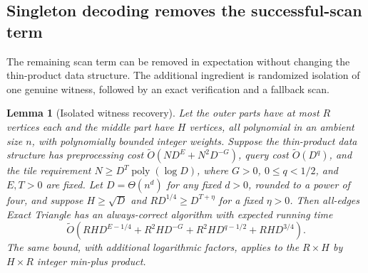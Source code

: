 \documentclass[11pt]{article}
\newtheorem{lemma}[theorem]{Lemma}
\newcommand{\softO}{\widetilde O}
\begin{document}
\subsection*{Singleton decoding removes the successful-scan term}
The remaining scan term can be removed in expectation without changing the
thin-product data structure. The additional ingredient is randomized
isolation of one genuine witness, followed by an exact verification and a
fallback scan.

\begin{lemma}[Isolated witness recovery]
\label{lem:isolation}
Let the outer parts have at most $R$ vertices each and the middle part have
$H$ vertices, all polynomial in an ambient size $n$, with polynomially
bounded integer weights. Suppose the thin-product data structure has
preprocessing cost $\softO(ND^E+N^2D^{-G})$, query cost $\softO(D^q)$,
and the tile requirement $N\ge D^T\operatorname{poly}(\log D)$,
where $G>0$, $0\le q<1/2$, and $E,T>0$ are fixed. Let
$D=\Theta(n^d)$ for any fixed $d>0$, rounded to a power of four, and
suppose $H\ge\sqrt D$ and $RD^{1/4}\ge D^{T+\eta}$ for a fixed
$\eta>0$. Then all-edges Exact Triangle has an always-correct algorithm
with expected running time
\begin{equation}
\softO\left(RHD^{E-1/4}+R^2HD^{-G}
             +R^2HD^{q-1/2}+RHD^{3/4}\right).
\label{eq:isolation-costs}
\end{equation}
The same bound, with additional logarithmic factors, applies to the
$R\times H$ by $H\times R$ integer min-plus product.
\end{lemma}
\end{document}

